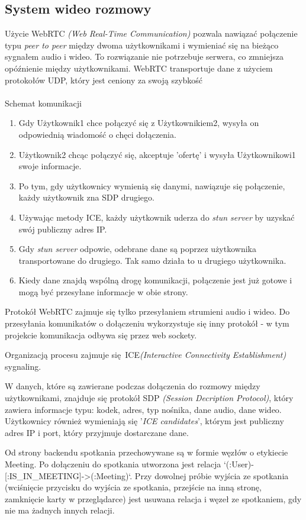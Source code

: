\documentclass{article}
\begin{document}
\subsection{System wideo rozmowy}
Użycie WebRTC \textit{(Web Real-Time Communication)} pozwala nawiązać połączenie typu \textit{peer to peer} między dwoma użytkownikami i wymieniać się na bieżąco sygnałem audio i wideo. To rozwiązanie nie potrzebuje serwera, co zmniejsza opóźnienie między użytkownikami. WebRTC transportuje dane z użyciem protokołów UDP, który jest ceniony za swoją szybkość
\\\\
 Schemat komunikacji
 \begin{enumerate}
     \item Gdy Użytkownik1 chce połączyć się z Użytkownikiem2, wysyła on odpowiednią wiadomość o chęci dołączenia.
     \item  Użytkownik2 chcąc połączyć się, akceptuje 'ofertę' i wysyła Użytkownikowi1 swoje informacje.
     \item  Po tym, gdy użytkownicy wymienią się danymi, nawiązuje się połączenie, każdy użytkownik zna SDP drugiego.
     \item Używając metody ICE, każdy użytkownik uderza do \textit{stun server} by uzyskać swój publiczny adres IP.
     \item Gdy \textit{stun server} odpowie, odebrane dane są poprzez użytkownika transportowane do drugiego. Tak samo działa to u drugiego użytkownika.
     \item Kiedy dane znajdą wspólną drogę komunikacji, połączenie jest już gotowe i mogą być przesyłane informacje w obie strony.
 \end{enumerate}

Protokół WebRTC zajmuje się tylko przesyłaniem strumieni audio i wideo.
Do przesyłania komunikatów o dołączeniu wykorzystuje się inny protokół - w tym
projekcie komunikacja odbywa się przez web sockety.

Organizacją procesu zajmuje się ICE\textit{(Interactive Connectivity Establishment)} sygnaling.

 W danych, które są zawierane podczas dołączenia do rozmowy między użytkownikami, znajduje się protokół SDP \textit{(Session Decription Protocol)}, który zawiera informacje typu: kodek, adres, typ nośnika, dane audio, dane wideo. Użytkownicy również wymieniają się '\textit{ICE candidates}', którym jest publiczny adres IP i port, który przyjmuje dostarczane dane.

Od strony backendu spotkania przechowywane są w formie węzłów o etykiecie Meeting.
Po dołączeniu do spotkania utworzona jest relacja `(:User)-[:IS_IN_MEETING]->(:Meeting)`.
Przy dowolnej próbie wyjścia ze spotkania (wciśnięcie przycisku do wyjścia ze spotkania,
przejście na inną stronę, zamknięcie karty w przeglądarce) jest usuwana relacja
i węzeł ze spotkaniem, gdy nie ma żadnych innych relacji.
\end{document}
